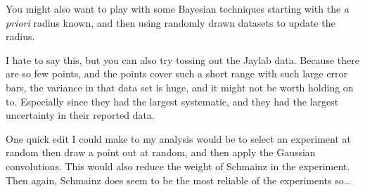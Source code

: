 \documentclass[12pt]{article}
\begin{document}
You might also want to play with some Bayesian techniques starting with the \emph{a priori} radius known, and then using randomly drawn datasets to update the radius. 

I hate to say this, but you can also try tossing out the Jaylab data. Because there are so few points, and the points cover such a short range with such large error bars, the variance in that data set is huge, and it might not be worth holding on to. Especially since they had the largest systematic, and they had the largest uncertainty in their reported data.

One quick edit I could make to my analysis would be to select an experiment at random then draw a point out at random, and then apply the Gaussian convolutions. This would also reduce the weight of Schmainz in the experiment. Then again, Schmainz does seem to be the most reliable of the experiments so\ldots
\end{document}

